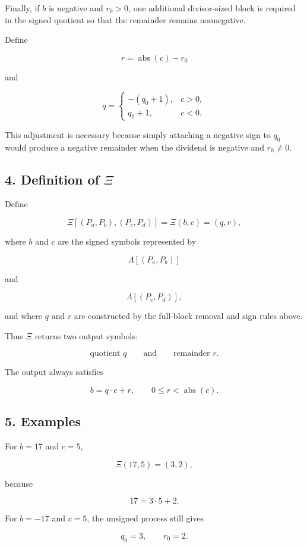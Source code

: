 \documentclass[12pt]{article}
\begin{document}
Finally, if \(b\) is negative and \(r_0>0\), one additional divisor-sized block is required in the signed quotient so that the remainder remains nonnegative.

Define

\[
\boxed{
r=\operatorname{abs}(c)-r_0
}
\]

and

\[
\boxed{
q=
\begin{cases}
-(q_0+1), & c>0,\\[4pt]
q_0+1, & c<0.
\end{cases}
}
\]

This adjustment is necessary because simply attaching a negative sign to \(q_0\) would produce a negative remainder when the dividend is negative and \(r_0\neq0\).

\subsection*{4. Definition of \(\Xi\)}

Define

\[
\boxed{
\Xi
\left[
(P_a,P_b),(P_c,P_d)
\right]
=
\Xi(b,c)
=
(q,r),
}
\]

where \(b\) and \(c\) are the signed symbols represented by

\[
\Lambda[(P_a,P_b)]
\]

and

\[
\Lambda[(P_c,P_d)],
\]

and where \(q\) and \(r\) are constructed by the full-block removal and sign rules above.

Thus \(\Xi\) returns two output symbols:

\[
\boxed{
\text{quotient }q
\qquad\text{and}\qquad
\text{remainder }r.
}
\]

The output always satisfies

\[
\boxed{
b=q\cdot c+r,
\qquad
0\leq r<\operatorname{abs}(c).
}
\]

\subsection*{5. Examples}

For \(b=17\) and \(c=5\),

\[
\Xi(17,5)=(3,2),
\]

because

\[
17=3\cdot5+2.
\]

For \(b=-17\) and \(c=5\), the unsigned process still gives

\[
q_0=3,
\qquad
r_0=2.
\]
\end{document}
